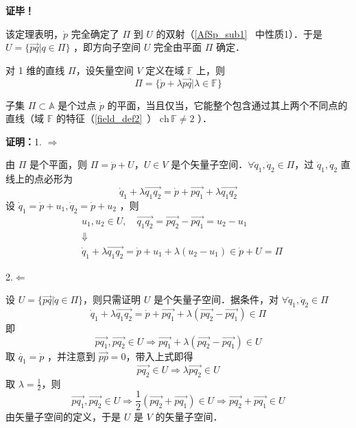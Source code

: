 \textbf{证毕！}

该定理表明，$\dot p$ 完全确定了 $\Pi$ 到 $U$ 的双射（\autoref{AfSp_sub1}~ 中性质1）．于是 $U=\{\vec{pq}|q\in \Pi\}$ ，即方向子空间 $U$ 完全由平面 $\Pi$ 确定．

对 1 维的直线 $\Pi$，设矢量空间 $V$ 定义在域 $\mathbb F$ 上，则
\begin{equation}
\Pi=\{\dot p+\lambda\vec{pq}|\lambda\in \mathbb F\}
\end{equation}
\begin{theorem}{}
子集 $\Pi \subset\mathbb A$ 是个过点 $\dot p$ 的平面，当且仅当，它能整个包含通过其上两个不同点的直线（域 $\mathbb F$ 的特征（\autoref{field_def2}~） $\mathrm{ch}\,\mathbb F\neq 2$ ）．
\end{theorem}
\textbf{证明：}1.
$\Rightarrow$

由 $\Pi$ 是个平面，则 $\Pi=\dot p+U$，$U\in V$ 是个矢量子空间．$\forall\dot q_1,\dot q_2\in \Pi$，过 $\dot q_1,\dot q_2$ 直线上的点必形为
\begin{equation}
\dot q_1+\lambda\vec{q_1q_2}=\dot p+\vec{pq_1}+\lambda\vec{q_1q_2}
\end{equation}
设 $\dot q_1=\dot p+u_1,\dot q_2=\dot p+u_2$ ，则
\begin{equation}
\begin{aligned}
&u_1,u_2\in U,\quad \vec{q_1q_2}=\vec{pq_2}-\vec{pq_1}=u_2-u_1\\
&\Downarrow\\
&\dot q_1+\lambda\vec{q_1q_2}=\dot p+u_1+\lambda(u_2-u_1)\in\dot p+U=\Pi
\end{aligned}
\end{equation}

2.$\Leftarrow$

设 $U=\{\vec{pq}|\dot q\in \Pi\}$，则只需证明 $U$ 是个矢量子空间．据条件，对 $\forall \dot q_1,\dot q_2\in\Pi$
\begin{equation}
\dot q_1+\lambda\vec{q_1q_2}=\dot p+\vec{pq_1}+\lambda(\vec{pq_2}-\vec{pq_1})\in\Pi
\end{equation}
 即
 \begin{equation}
 \vec{pq_1},\vec{pq_2}\in U\Rightarrow \vec{pq_1}+\lambda(\vec{pq_2}-\vec{pq_1})\in U
 \end{equation}
 取 $\dot{q_1}=\dot{p}$ ，并注意到 $\vec{pp}=0$，带入上式即得 
 \begin{equation}\label{SAfSp_eq2}
 \vec{pq_2}\in U\Rightarrow\lambda\vec{pq_2}\in U 
 \end{equation}
取 $\lambda=\frac{1}{2}$，则 
\begin{equation}
\vec{pq_1},\vec{pq_2}\in U\Rightarrow \frac{1}{2}(\vec{pq_2}+\vec{pq_1})\in U\Rightarrow \vec{pq_2}+\vec{pq_1}\in U
\end{equation}
由矢量子空间的定义，于是 $U$ 是 $V$ 的矢量子空间．

